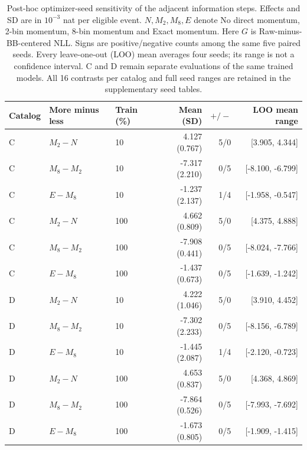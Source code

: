 \begin{table}[!htbp]
\centering
\normalsize
\setlength{\tabcolsep}{3pt}
\caption{Post-hoc optimizer-seed sensitivity of the adjacent information steps. Effects and SD are in $10^{-3}$ nat per eligible event. $N,M_2,M_8,E$ denote No direct momentum, 2-bin momentum, 8-bin momentum and Exact momentum. Here $G$ is Raw-minus-BB-centered NLL. Signs are positive/negative counts among the same five paired seeds. Every leave-one-out (LOO) mean averages four seeds; its range is not a confidence interval. C and D remain separate evaluations of the same trained models. All 16 contrasts per catalog and full seed ranges are retained in the supplementary seed tables.}\label{tab:seed_adjacent_summary}
\begin{tabular}{lllrrr}
\toprule Catalog & More minus less & Train (\%) & Mean (SD) & $+/-$ & LOO mean range\\ \midrule
C & $M_2-N$ & 10 & 4.127 (0.767) & 5/0 & [3.905, 4.344]\\
C & $M_8-M_2$ & 10 & -7.317 (2.210) & 0/5 & [-8.100, -6.799]\\
C & $E-M_8$ & 10 & -1.237 (2.137) & 1/4 & [-1.958, -0.547]\\
C & $M_2-N$ & 100 & 4.662 (0.809) & 5/0 & [4.375, 4.888]\\
C & $M_8-M_2$ & 100 & -7.908 (0.441) & 0/5 & [-8.024, -7.766]\\
C & $E-M_8$ & 100 & -1.437 (0.673) & 0/5 & [-1.639, -1.242]\\
D & $M_2-N$ & 10 & 4.222 (1.046) & 5/0 & [3.910, 4.452]\\
D & $M_8-M_2$ & 10 & -7.302 (2.233) & 0/5 & [-8.156, -6.789]\\
D & $E-M_8$ & 10 & -1.445 (2.087) & 1/4 & [-2.120, -0.723]\\
D & $M_2-N$ & 100 & 4.653 (0.837) & 5/0 & [4.368, 4.869]\\
D & $M_8-M_2$ & 100 & -7.864 (0.526) & 0/5 & [-7.993, -7.692]\\
D & $E-M_8$ & 100 & -1.673 (0.805) & 0/5 & [-1.909, -1.415]\\
\bottomrule
\end{tabular}
\end{table}
